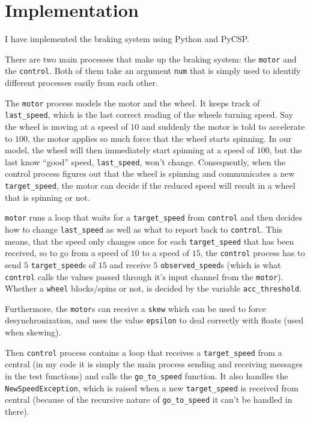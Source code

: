 \documentclass[a4paper, 10pt]{article}
\begin{document}
\maketitle

\newpage

\section{Implementation}

I have implemented the braking system using Python and PyCSP. 

There are two main processes that make up the braking system: the
\verb+motor+ and the \verb+control+. Both of them take an argument \verb+num+ that
is simply used to identify different processes easily from each other.

The \verb+motor+ process models the motor and the wheel. It keeps track of
\verb+last_speed+, which is the last correct reading of the wheels
turning speed. Say the wheel is moving at a speed of $10$ and suddenly
the motor is told to accelerate to $100$, the motor applies so much
force that the wheel starts spinning. In our model, the wheel will
then immediately start spinning at a speed of $100$, but the last know
``good'' speed, \verb+last_speed+, won't change. Consequently, when
the control process figures out that the wheel is spinning and
communicates a new \verb+target_speed+, the motor can decide if the
reduced speed will result in a wheel that is spinning or not. 

\verb+motor+ runs a loop that waits for a \verb+target_speed+ from
\verb+control+ and then decides how to change \verb+last_speed+ as
well as what to report back to \verb+control+. This means, that the
speed only changes once for each \verb+target_speed+ that has been
received, so to go from a speed of $10$ to a speed of $15$, the
\verb+control+ process has to send $5$ \verb+target_speed+s of $15$
and receive $5$ \verb+observed_speed+s (which is what \verb+control+
calls the values passed through it's input channel from the
\verb+motor+). Whether a \verb+wheel+ blocks/spins or not, is decided
by the variable \verb+acc_threshold+.

Furthermore, the \verb+motor+s can receive a \verb+skew+ which can be
used to force desynchronization, and uses the value \verb+epsilon+ to
deal correctly with floats (used when skewing).

Then \verb+control+ process contains a loop that receives a
\verb+target_speed+ from a central (in my code it is simply the
main process sending and receiving messages in the test functions) and
calls the \verb+go_to_speed+ function. It also handles the
\verb+NewSpeedException+, which is raised when a new
\verb+target_speed+ is received from central (because of the recursive
nature of \verb+go_to_speed+ it can't be handled in there).
\end{document}
